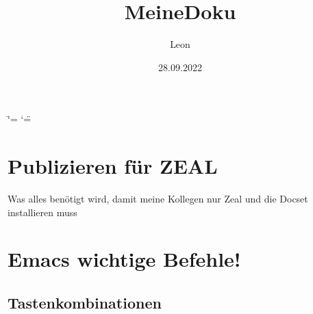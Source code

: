 \documentclass[letterpaper,10pt,ngerman]{sphinxmanual}
\title{MeineDoku}
\date{28.09.2022}
\author{Leon}
\begin{document}
\ifdefined\shorthandoff
  \ifnum\catcode`\=\string=\active\shorthandoff{=}\fi
  \ifnum\catcode`\"=\active{}\fi
\fi

\pagestyle{empty}
\sphinxmaketitle
\pagestyle{plain}
\sphinxtableofcontents
\pagestyle{normal}
\label{\detokenize{index::doc}}


\begin{sphinxShadowBox}

\noindent{}
\end{sphinxShadowBox}

\sphinxstepscope


\chapter{Publizieren für ZEAL}
\label{\detokenize{ueberblick:publizieren-fur-zeal}}\label{\detokenize{ueberblick::doc}}
\sphinxAtStartPar
Was alles benötigt wird, damit meine Kollegen
nur Zeal und die Docset installieren muss

\noindent{}

\sphinxstepscope


\chapter{Emacs wichtige Befehle!}
\label{\detokenize{emacs/emacs-basics:emacs-wichtige-befehle}}\label{\detokenize{emacs/emacs-basics::doc}}

\section{Tastenkombinationen}
\label{\detokenize{emacs/emacs-basics:tastenkombinationen}}
\end{document}
